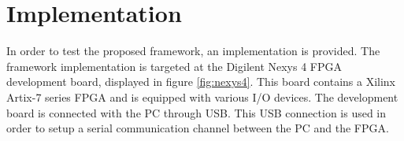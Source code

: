 \documentclass[openright]{template/uva-bachelor-thesis}
\begin{document}







\chapter{Implementation}
In order to test the proposed framework, an implementation is provided. The framework implementation is targeted at the Digilent Nexys 4 FPGA development board, displayed in figure \ref{fig:nexys4}. This board contains a Xilinx Artix-7 series FPGA and is equipped with various I/O devices. The development board is connected with the PC through USB. This USB connection is used in order to setup a serial communication channel between the PC and the FPGA.
\end{document}
